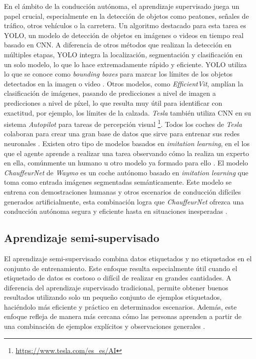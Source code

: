 En el ámbito de la conducción autónoma, el aprendizaje supervisado juega un papel crucial, especialmente en la detección de objetos como peatones, señales de tráfico, otros vehículos o la carretera. Un algoritmo destacado para esta tarea es \ac{YOLO}, un modelo de detección de objetos en imágenes o videos en tiempo real basado en \ac{CNN}. A diferencia de otros métodos que realizan la detección en múltiples etapas, \ac{YOLO} integra la localización, segmentación y clasificación en un solo modelo, lo que lo hace extremadamente rápido y eficiente. \ac{YOLO} utiliza lo que se conoce como \textit{bounding boxes} para marcar los límites de los objetos detectados en la imagen o video \cite{yolo}. Otros modelos, como \textit{EfficientVit}, amplían la clasificación de imágenes, pasando de predicciones a nivel de imagen a predicciones a nivel de píxel, lo que resulta muy útil para identificar con exactitud, por ejemplo, los límites de la calzada. \textit{Tesla} también utiliza \ac{CNN} en su sistema \textit{Autopilot} para tareas de percepción visual \footnote{\url{https://www.tesla.com/es_es/AI}}. Todos los coches de \textit{Tesla} colaboran para crear una gran base de datos que sirve para entrenar sus redes neuronales \cite{tesla-dataset}. Existen otro tipo de modelos basados en \textit{imitation learning}, en el los que el agente aprende a realizar una tarea observando cómo la realiza un experto en ella, comúnmente un humano u otro modelo ya formado para ello \cite{imitation-learning}. El modelo \textit{ChauffeurNet} de \textit{Waymo} es un coche autónomo basado en \textit{imitation learning} que toma como entrada imágenes segmentadas semánticamente. Este modelo se entrena con demostraciones humanas y otros escenarios de conducción difíciles generados artificialmente, esta combinación logra que \textit{ChauffeurNet} ofrezca una conducción autónoma segura y eficiente hasta en situaciones inesperadas \cite{chauffeurnet-paper}.


\subsection{Aprendizaje semi-supervisado}

El aprendizaje semi-supervisado combina datos etiquetados y no etiquetados en el conjunto de entrenamiento. Este enfoque resulta especialmente útil cuando el etiquetado de datos es costoso o difícil de realizar en grandes cantidades. A diferencia del aprendizaje supervisado tradicional, permite obtener buenos resultados utilizando solo un pequeño conjunto de ejemplos etiquetados, haciéndolo más eficiente y práctico en determinados escenarios. Además, este enfoque refleja de manera más cercana cómo las personas aprenden a partir de una combinación de ejemplos explícitos y observaciones generales \cite{semi}.

